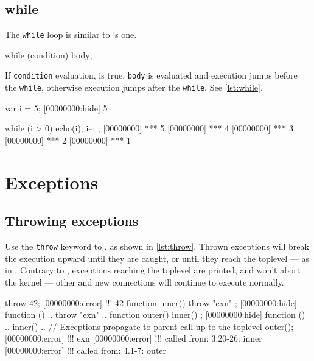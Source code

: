 \subsection{while}

The \lstinline|while| loop is similar to \C's one.

\begin{urbiscript}[frame=, backgroundcolor=, ]
while (condition)
  body;
\end{urbiscript}

If \lstinline|condition| evaluation, is true, \lstinline|body| is
evaluated and execution jumps before the \lstinline|while|, otherwise
execution jumps after the \lstinline|while|. See \autoref{lst:while}.

\begin{urbiscript}[caption=The \lstinline|while| construct, label=lst:while,
  float=\floatpos]
var i = 5;
[00000000:hide] 5

while (i > 0)
{
  echo(i);
  i--;
};
[00000000] *** 5
[00000000] *** 4
[00000000] *** 3
[00000000] *** 2
[00000000] *** 1
\end{urbiscript}

\FloatBarrier
\section{Exceptions}

\subsection{Throwing exceptions}

Use the \lstinline|throw| keyword to , as shown in \autoref{lst:throw}. Thrown exceptions will
break the execution upward until they are caught, or until they reach
the toplevel --- as in \Cxx.  Contrary to \Cxx, exceptions reaching
the toplevel are printed, and won't abort the kernel --- other and new
connections will continue to execute normally.

\begin{urbiscript}[caption=Throwing exceptions, label=lst:throw,
  float=\floatpos]
throw 42;
[00000000:error] !!! 42
function inner() { throw "exn" };
[00000000:hide] function () {
..  throw "exn"
..}
function outer() { inner() };
[00000000:hide] function () {
..  inner()
..}
// Exceptions propagate to parent call up to the toplevel
outer();
[00000000:error] !!! exn
[00000000:error] !!!    called from: 3.20-26: inner
[00000000:error] !!!    called from: 4.1-7: outer
\end{urbiscript}

